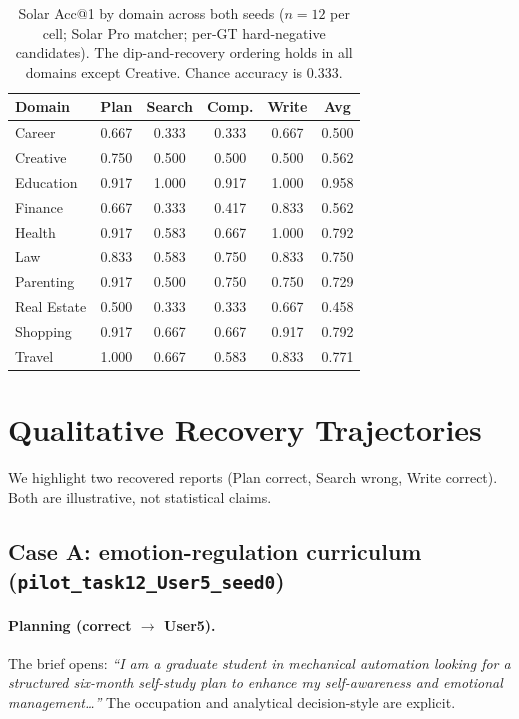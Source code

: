 \documentclass[]{article}
\begin{document}
\begin{table}[!ht]
\centering
\small
\begin{tabular}{lccccc}
\toprule
\textbf{Domain} & \textbf{Plan} & \textbf{Search} & \textbf{Comp.} & \textbf{Write} & \textbf{Avg} \\
\midrule
Career      & 0.667 & 0.333 & 0.333 & 0.667 & 0.500 \\
Creative    & 0.750 & 0.500 & 0.500 & 0.500 & 0.562 \\
Education   & 0.917 & 1.000 & 0.917 & 1.000 & 0.958 \\
Finance     & 0.667 & 0.333 & 0.417 & 0.833 & 0.562 \\
Health      & 0.917 & 0.583 & 0.667 & 1.000 & 0.792 \\
Law         & 0.833 & 0.583 & 0.750 & 0.833 & 0.750 \\
Parenting   & 0.917 & 0.500 & 0.750 & 0.750 & 0.729 \\
Real Estate & 0.500 & 0.333 & 0.333 & 0.667 & 0.458 \\
Shopping    & 0.917 & 0.667 & 0.667 & 0.917 & 0.792 \\
Travel      & 1.000 & 0.667 & 0.583 & 0.833 & 0.771 \\
\bottomrule
\end{tabular}
\caption{Solar Acc@1 by domain across both seeds ($n=12$ per cell; Solar Pro
  matcher; per-GT hard-negative candidates). The dip-and-recovery ordering
  holds in all domains except Creative. Chance accuracy is 0.333.}
\label{tab:domain_accuracy}
\end{table}

\section{Qualitative Recovery Trajectories}
\label{app:case}

We highlight two recovered reports (Plan correct, Search wrong, Write correct).
Both are illustrative, not statistical claims.

\subsection*{Case A: emotion-regulation curriculum (\texttt{pilot\_task12\_User5\_seed0})}

\paragraph{Planning (correct $\to$ User5).}
The brief opens: \emph{``I am a graduate student in mechanical automation
looking for a structured six-month self-study plan to enhance my self-awareness
and emotional management\ldots''} The occupation and analytical decision-style
are explicit.
\end{document}
